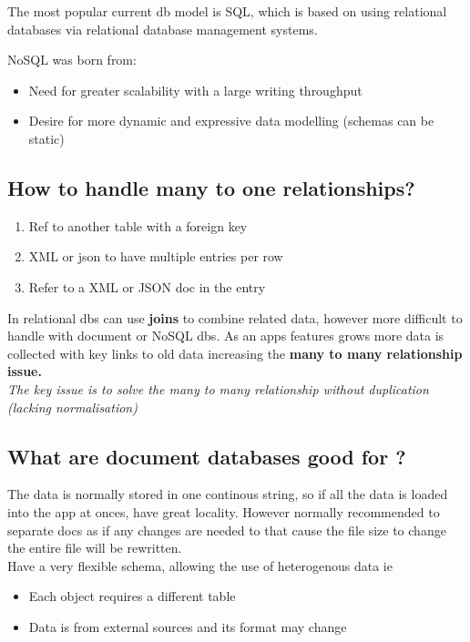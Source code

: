 \documentclass[11pt]{scrartcl} %
\begin{document}
The most popular current db model is SQL, which is based on using relational databases via relational database management
systems.

NoSQL was born from:
\begin{itemize}
	\item Need for greater scalability with a large writing throughput
	\item Desire for more dynamic and expressive data modelling (schemas can be static)
\end{itemize}

\subsection{How to handle many to one relationships?}

\begin{enumerate}
	\item Ref to another table with a foreign key
	\item XML or json to have multiple entries per row
	\item Refer to a XML or JSON doc in the entry
\end{enumerate}

In relational dbs can use \textbf{joins} to combine related data, however more difficult to handle with document or NoSQL dbs.
As an apps features grows more data is collected with key links to old data increasing the \textbf{many to many relationship issue.}\\

\textit{The key issue is to solve the many to many relationship without duplication (lacking normalisation)}

\subsection{What are document databases good for ?}

The data is normally stored in one continous string, so if all the data is loaded into the app at onces, have great locality. However normally recommended to separate docs
as if any changes are needed to that cause the file size to change the entire file will be rewritten.\\

Have a very flexible schema, allowing the use of heterogenous data ie 

\begin{itemize}
	\item Each object requires a different table
	\item Data is from external sources and its format may change
\end{itemize}
\end{document}
